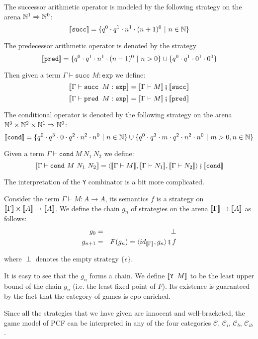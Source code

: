 The successor arithmetic operator is modeled by the following
strategy on the arena $\mathbb{N}^1 \Rightarrow \mathbb{N}^0$:
$${[\![ \texttt{succ} ]\!]} = \{q^0 \cdot q^1 \cdot n^1 \cdot (n+1)^0\ |\ n \in \mathbb{N} \}$$

The predecessor arithmetic operator is denoted by the strategy
$${[\![ \texttt{pred} ]\!]} = \{q^0 \cdot q^1 \cdot n^1 \cdot (n-1)^0\ |\ n >0 \} \cup \{ q^0 \cdot q^1 \cdot 0^1 \cdot 0^0 \} $$

Then given a term $\Gamma \vdash \texttt{succ }M : \texttt{exp}$ we
define:
$${[\![ \Gamma \vdash \texttt{succ } M : \texttt{exp} ]\!]} = {[\![ \Gamma \vdash M ]\!]} \fatsemi {[\![\texttt{succ} ]\!]} $$
$${[\![ \Gamma \vdash \texttt{pred } M : \texttt{exp} ]\!]} = {[\![ \Gamma \vdash M ]\!]} \fatsemi {[\![\texttt{pred} ]\!]} $$


The conditional operator is denoted by the following strategy on the
arena $\mathbb{N}^3 \times \mathbb{N}^2 \times \mathbb{N} ^1 \Rightarrow \mathbb{N}^0$:
$${[\![ \texttt{cond} ]\!]} =
    \{ q^0 \cdot q^3 \cdot 0 \cdot q^2 \cdot n^2 \cdot n^0 \ | \ n \in \mathbb{N} \}
    \cup
    \{ q^0 \cdot q^3 \cdot m \cdot q^2 \cdot n^2 \cdot n^0 \ | \ m >0, n \in \mathbb{N} \}
    $$


Given a term $\Gamma \vdash \texttt{cond}\ M\ N_1\ N_2$ we define:
$$\sem{\Gamma \vdash \texttt{cond}\ M\ N_1\ N_2} =
\langle \sem{\Gamma \vdash M}, \sem{\Gamma \vdash N_1}, \sem{\Gamma
\vdash N_2} \rangle \fatsemi \sem{\texttt{cond}}$$


The interpretation of the \texttt{Y} combinator is a bit more
complicated.

Consider the term $\Gamma \vdash M : A \rightarrow A$, its semantics
$f$ is a strategy on ${[\![ \Gamma ]\!]} \times {[\![A ]\!]} \rightarrow
{[\![A ]\!]}$. We define the chain $g_n$ of strategies on the arena
${[\![ \Gamma ]\!]} \rightarrow {[\![A ]\!]}$ as follows:
\begin{eqnarray*}
g_0 &=& \perp \\
g_{n+1} &=&  F(g_n) = \langle id_{{[\![ \Gamma ]\!]}}, g_n\rangle \fatsemi f
\end{eqnarray*}

where $\perp$ denotes the empty strategy $\{ \epsilon \}$.

It is easy to see that the $g_n$ forms a chain. We define
${[\![ \texttt{Y } M ]\!]}$ to be the least upper bound of the chain $g_n$
(i.e. the  least fixed point of $F$). Its existence is guaranteed by
the fact that the category of games is cpo-enriched.

Since all the strategies that we have given are innocent and
well-bracketed, the game model of PCF can be interpreted in any of
the four categories $\mathcal{C}$, $\mathcal{C}_i$, $\mathcal{C}_b$,
$\mathcal{C}_{ib}$.



